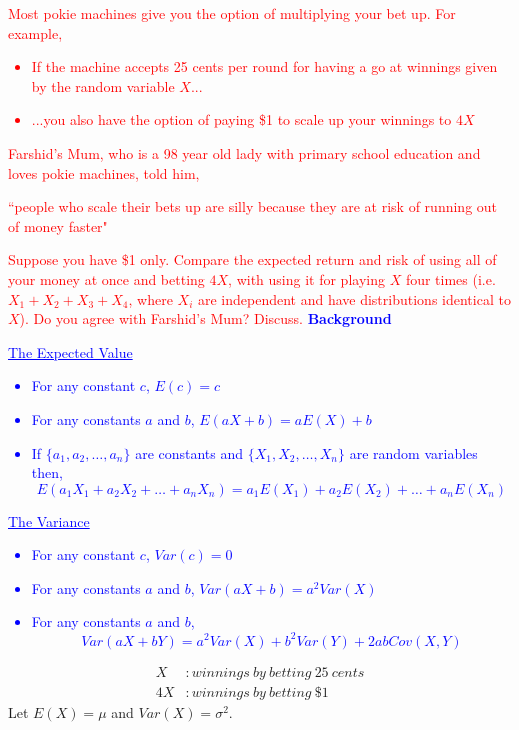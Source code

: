 \documentclass[12pt]{report}
\newenvironment{blueframed}[1][blue]
{\def\FrameCommand{\fboxsep=\FrameSep\fcolorbox{#1}{white}}%
\MakeFramed {\advance\hsize-\width \FrameRestore}}
{\endMakeFramed}
\begin{document}
\noindent \textcolor{red}{Most pokie machines give you the option of multiplying your bet up. For example,}
\noindent \textcolor{red}{
	\begin{itemize}
	\item If the machine accepts 25 cents per round for having a go at winnings given by the random variable $X$...
	\item ...you also have the option of paying \$1 to scale up your winnings to $4X$
\end{itemize}
}
\noindent \textcolor{red}{Farshid's Mum, who is a 98 year old lady with primary school education and loves pokie machines, told him,}
\noindent \textcolor{red}{\begin{center}
		``people who scale their bets up are silly because they are at risk of running out of money faster"
	\end{center}
}
\noindent \textcolor{red}{Suppose you have \$1 only. Compare the expected return and risk of using all of your money at once and betting $4X$, with using it for playing $X$ four times (i.e. $X_1+X_2+X_3+X_4$, where $X_i$ are independent and have distributions identical to $X$). Do you agree with Farshid's Mum? Discuss.}
\justify
\begin{blueframed}
	\textcolor{blue}{\textbf{Background}}
	\vspace{-\baselineskip}
	\justify
	\textcolor{blue}{\underline{The Expected Value} \begin{itemize}
			\item For any constant $c$, $E(c) = c$
			\item For any constants $a$ and $b$, $E(aX + b) = aE(X) + b$
			\item If $\{a_1, a_2, \dots, a_n\}$ are constants and $\{X_1, X_2, \dots, X_n \}$ are random variables then, $$E(a_1 X_1 + a_2 X_2 + \dots + a_n X_n) = a_1E(X_1) + a_2E(X_2) + \dots + a_nE(X_n)$$
		\end{itemize} \underline{The Variance} %
	\begin{itemize}
		\item For any constant $c$, $Var(c) = 0$
		\item For any constants $a$ and $b$, $Var(aX + b) = a^2Var(X)$
		\item For any constants $a$ and $b$, $$Var(aX + bY) = a^2Var(X) + b^2Var(Y) + 2abCov(X,Y)$$
	\end{itemize}}
\end{blueframed}
\begin{align*}
	X&: winnings\ by\ betting\ 25\ cents \\
	4X&: winnings\ by\ betting\ \$1 
\end{align*}
\noindent Let $E(X) = \mu$ and $Var(X) = \sigma^2$.
\end{document}
